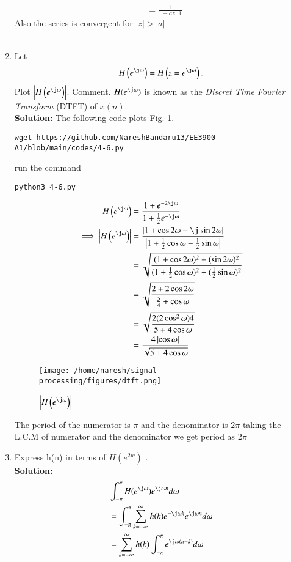 \documentclass[journal,12pt,twocolumn]{IEEEtran}
\renewcommand\thesection{\arabic{section}}
\newcommand{\solution}{\noindent \textbf{Solution: }}
\providecommand{\brak}[1]{\ensuremath{\left(#1\right)}}
\providecommand{\abs}[1]{\left\vert#1\right\vert}
\numberwithin{equation}{section}
\renewcommand\thesection{\arabic{section}}
\begin{document}
\begin{enumerate}[label=\thesection.\arabic*]
\begin{align*}
     &= \frac{1}{1-az^-1}
\end{align*}
Also the series is convergent for $|z| > |a|$\\\\
%
\item 
Let
\begin{equation}
H\brak{e^{\j \omega}} = H\brak{z = e^{\j \omega}}.
\end{equation}
Plot $\abs{H\brak{e^{\j \omega}}}$.  Comment.  $H(e^{\j \omega})$ is
known as the {\em Discret Time Fourier Transform} (DTFT) of $x(n)$.\\
\solution The following code plots Fig. \ref{fig:dtft}.
\begin{lstlisting}
wget https://github.com/NareshBandaru13/EE3900-A1/blob/main/codes/4-6.py
\end{lstlisting}
run the command
\begin{lstlisting}
python3 4-6.py
\end{lstlisting}
\begin{align}
		H\brak{e^{\j \omega}} &= \frac{1 + e^{-2\j\omega}}{1 + \frac12 e^{-\j\omega}} \\
		\implies \abs{H\brak{e^{\j \omega}}} &= \frac{\abs{1 + \cos2\omega - \j\sin2\omega}}{\abs{1 + \frac12 \cos\omega - \frac12 \sin\omega}} \\
		&= \sqrt{\frac{(1 + \cos2\omega)^2 + (\sin2\omega)^2}{(1 + \frac12 \cos\omega)^2 + (\frac12 \sin\omega)^2}} \\
		&= \sqrt{\frac{2 + 2\cos2\omega}{\frac54 + \cos\omega}} \\
		&= \sqrt{\frac{2(2\cos^2\omega)4}{5 + 4\cos\omega} } \\
		&= \frac{4\abs{\cos\omega}}{\sqrt{5 + 4\cos\omega}}
	\end{align} 
\begin{figure}[!ht]
\centering
\texttt{[image: /home/naresh/signal processing/figures/dtft.png]}
\caption{$\abs{H\brak{e^{\j\omega}}}$}
\label{fig:dtft}
\end{figure}
The period of the numerator is $\pi$ and the denominator is $2\pi$ taking the L.C.M of numerator and the denominator we get
period as $2\pi$

\item Express h(n) in terms of $H(e^{2w})$ .\\
\solution 
 \begin{align}
  &\int_{-\pi}^{\pi} H(e^{\j\omega}) e^{\j\omega n} {d\omega} \\
  &= \int_{-\pi}^{\pi} \sum_{k=-\infty}^\infty h(k)  e^{-\j\omega k} e^{\j\omega n} {d\omega} \\
  &= \sum_{k=-\infty}^\infty h(k) \int_{-\pi}^{\pi} e^{\j\omega(n-k)} {d\omega}
 \end{align}
 

\end{enumerate}
\end{document}
